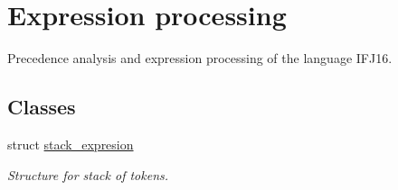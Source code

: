 \hypertarget{group__expression__processing}{}\section{Expression processing}
\label{group__expression__processing}


Precedence analysis and expression processing of the language I\+F\+J16.  


\subsection*{Classes}
\begin{DoxyCompactItemize}
\item 
struct \hyperlink{structstack__expresion}{stack\+\_\+expresion}
\begin{DoxyCompactList}\small\item\em Structure for stack of tokens. \end{DoxyCompactList}\end{DoxyCompactItemize}
